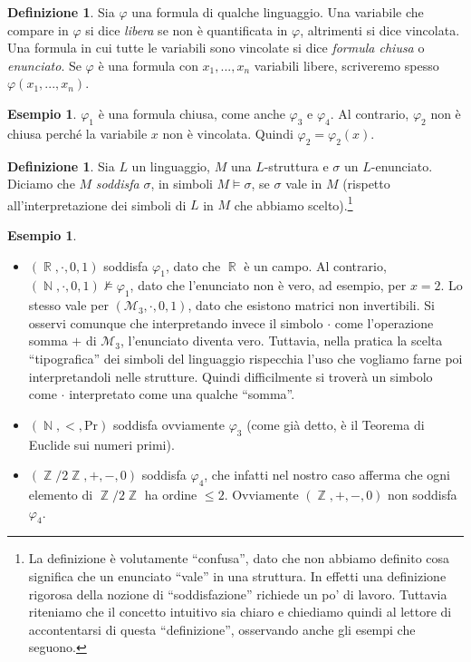 \documentclass[12pt,a4paper]{report}
\theoremstyle{definition}
\newtheorem{defn}[teo]{Definizione}  %
\newtheorem{es}[teo]{Esempio}  %
\theoremstyle{num.custom-title}
\DeclareMathOperator{\N}{\mathbb{N}}
\DeclareMathOperator{\R}{\mathbb{R}}
\DeclareMathOperator{\Z}{\mathbb{Z}}
\renewcommand{\phi}{\varphi}
\begin{document}
\begin{defn}
Sia $\phi$ una formula di qualche linguaggio. Una variabile che compare in $\phi$ si dice \emph{libera} se non è quantificata in $\phi$, altrimenti si dice vincolata. Una formula in cui tutte le variabili sono vincolate si dice \emph{formula chiusa} o \emph{enunciato}. Se $\phi$ è una formula con $x_1,...,x_n$ variabili libere, scriveremo spesso $\phi(x_1,...,x_n)$.
\end{defn}

\begin{es}
$\phi_1$ è una formula chiusa, come anche $\phi_3$ e $\phi_4$. Al contrario, $\phi_2$ non è chiusa perché la variabile $x$ non è vincolata. Quindi $\phi_2 = \phi_2(x)$.
\end{es}

\begin{defn}
Sia $L$ un linguaggio, $M$ una $L$-struttura e $\sigma$ un $L$-enunciato. Diciamo che $M$ \emph{soddisfa} $\sigma$, in simboli $M \models \sigma$, se $\sigma$ vale in $M$ (rispetto all'interpretazione dei simboli di $L$ in $M$ che abbiamo scelto).\footnote{La definizione è volutamente ``confusa'', dato che non abbiamo definito cosa significa che un enunciato ``vale'' in una struttura. In effetti una definizione rigorosa della nozione di ``soddisfazione'' richiede un po' di lavoro. Tuttavia riteniamo che il concetto intuitivo sia chiaro e chiediamo quindi al lettore di accontentarsi di questa ``definizione'', osservando anche gli esempi che seguono.}
\end{defn}

\begin{es}\
\begin{itemize}
\item $(\R,\cdot,0,1)$ soddisfa $\phi_1$, dato che $\R$ è un campo. Al contrario, $(\N,\cdot,0,1) \not\models \phi_1$, dato che l'enunciato non è vero, ad esempio, per $x=2$. Lo stesso vale per $(\mathcal{M}_3,\cdot,0,1)$, dato che esistono matrici non invertibili. Si osservi comunque che interpretando invece il simbolo $\cdot$ come l'operazione somma $+$ di $\mathcal{M}_3$, l'enunciato diventa vero. Tuttavia, nella pratica la scelta ``tipografica'' dei simboli del linguaggio rispecchia l'uso che vogliamo farne poi interpretandoli nelle strutture. Quindi difficilmente si troverà un simbolo come $\cdot$ interpretato come una qualche ``somma''.
\item $(\N,<,\text{Pr})$ soddisfa ovviamente $\phi_3$ (come già detto, è il Teorema di Euclide sui numeri primi).
\item $(\Z/2\Z,+,-,0)$ soddisfa $\phi_4$, che infatti nel nostro caso afferma che ogni elemento di $\Z/2\Z$ ha ordine $\leq 2$. Ovviamente $(\Z,+,-,0)$ non soddisfa $\phi_4$.
\end{itemize}
\end{es}
\end{document}
